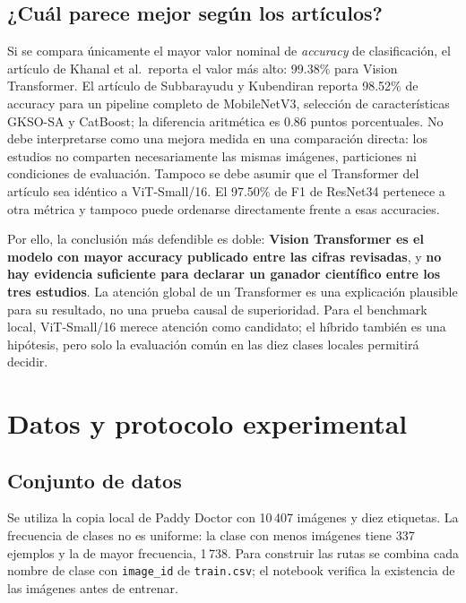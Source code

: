 \documentclass[11pt,a4paper]{article}
\begin{document}
\subsection{¿Cuál parece mejor según los artículos?}
Si se compara únicamente el mayor valor nominal de \emph{accuracy} de clasificación, el artículo de Khanal et al.\ reporta el valor más alto: 99.38\% para Vision Transformer. El artículo de Subbarayudu y Kubendiran reporta 98.52\% de accuracy para un pipeline completo de MobileNetV3, selección de características GKSO-SA y CatBoost; la diferencia aritmética es 0.86 puntos porcentuales. No debe interpretarse como una mejora medida en una comparación directa: los estudios no comparten necesariamente las mismas imágenes, particiones ni condiciones de evaluación. Tampoco se debe asumir que el Transformer del artículo sea idéntico a ViT-Small/16. El 97.50\% de F1 de ResNet34 pertenece a otra métrica y tampoco puede ordenarse directamente frente a esas accuracies.

Por ello, la conclusión más defendible es doble: \textbf{Vision Transformer es el modelo con mayor accuracy publicado entre las cifras revisadas}, y \textbf{no hay evidencia suficiente para declarar un ganador científico entre los tres estudios}. La atención global de un Transformer es una explicación plausible para su resultado, no una prueba causal de superioridad. Para el benchmark local, ViT-Small/16 merece atención como candidato; el híbrido también es una hipótesis, pero solo la evaluación común en las diez clases locales permitirá decidir.

\section{Datos y protocolo experimental}
\subsection{Conjunto de datos}
Se utiliza la copia local de Paddy Doctor con 10\,407 imágenes y diez etiquetas. La frecuencia de clases no es uniforme: la clase con menos imágenes tiene 337 ejemplos y la de mayor frecuencia, 1\,738. Para construir las rutas se combina cada nombre de clase con \texttt{image\_id} de \texttt{train.csv}; el notebook verifica la existencia de las imágenes antes de entrenar.
\end{document}
